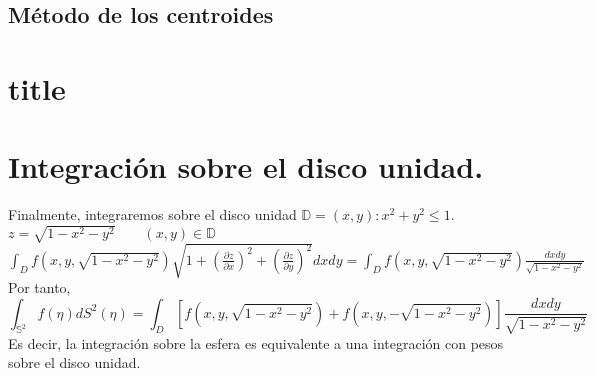 \subsection{Método de los centroides}

\section{title}

\section{Integración sobre el disco unidad.}
Finalmente, integraremos sobre el disco unidad $\mathds{D}={(x,y):x^2+y^2 \le 1}.$
$z=\sqrt{1-x^2-y^2} \qquad (x,y)\in \mathds{D}$
$\int_{D}f(x,y,\sqrt{1-x^2-y^2})\sqrt{1+(\frac{\partial z}{\partial x})^2+(\frac{\partial z}{\partial y})^2} dx dy = \int_D f(x,y,\sqrt{1-x^2-y^2})\frac{dx dy}{\sqrt{1-x^2-y^2}}$
Por tanto,
$$ \int_{\mathds{S}^2}f(\eta) dS^2(\eta) = \int_D \left[f(x,y,\sqrt{1-x^2-y^2})+f(x,y,-\sqrt{1-x^2-y^2})\right]\frac{dx dy}{\sqrt{1-x^2-y^2}} $$
Es decir, la integración sobre la esfera es equivalente a una integración con pesos sobre el disco unidad.